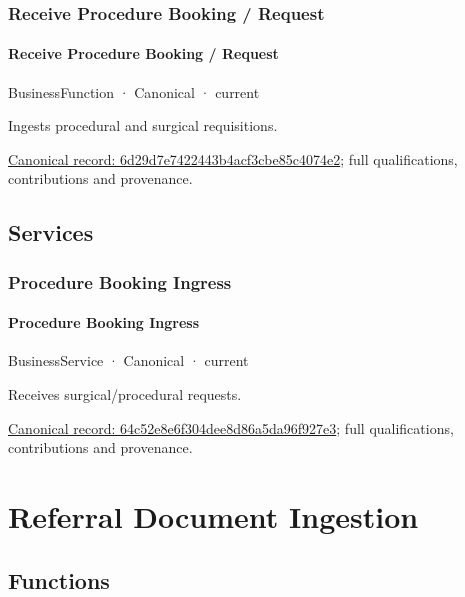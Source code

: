 \subsubsection{Receive Procedure Booking / Request}

\paragraph{Receive Procedure Booking / Request}

\label{element:6d29d7e7422443b4acf3cbe85c4074e2}
{\small BusinessFunction · Canonical · current}\par

Ingests procedural and surgical requisitions.


{\footnotesize \href{../../../../continuum/business/business-function/6d29d7e7422443b4acf3cbe85c4074e2.md}{Canonical record: 6d29d7e7422443b4acf3cbe85c4074e2}; full qualifications, contributions and provenance.}\par
\subsection{Services}

\subsubsection{Procedure Booking Ingress}

\paragraph{Procedure Booking Ingress}

\label{element:64c52e8e6f304dee8d86a5da96f927e3}
{\small BusinessService · Canonical · current}\par

Receives surgical/procedural requests.


{\footnotesize \href{../../../../continuum/business/business-service/64c52e8e6f304dee8d86a5da96f927e3.md}{Canonical record: 64c52e8e6f304dee8d86a5da96f927e3}; full qualifications, contributions and provenance.}\par
\section{Referral Document Ingestion}

\subsection{Functions}

